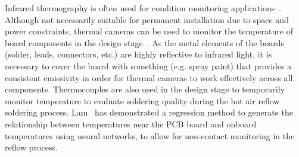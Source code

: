 Infrared thermography is often used for condition monitoring applications~\cite{Bagavathiappan2013}. Although not necessarily suitable for permanent installation due to space and power constraints, thermal cameras can be used to monitor the temperature of board components in the design stage~\cite{Sarawade2019}. As the metal elements of the boards (solder, leads, connectors, etc.) are highly reflective to infrared light, it is necessary to cover the board with something (e.g. spray paint) that provides a consistent emissivity in order for thermal cameras to work effectively across all components. Thermocouples are also used in the design stage to temporarily monitor temperature to evaluate soldering quality \cite{Sousa1991} during the hot air reflow soldering process. Lam~\cite{Lam2021} has demonstrated a regression method to generate the relationship between temperatures near the PCB board and onboard temperatures using neural networks, to allow for non-contact monitoring in the reflow process.









